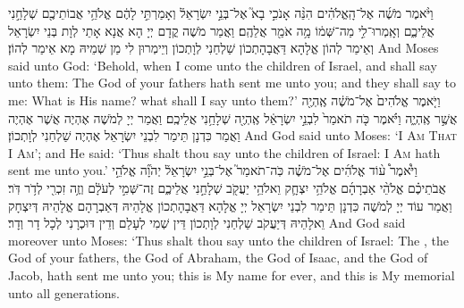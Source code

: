{וַיֹּ֨אמֶר מֹשֶׁ֜ה אֶל־הָֽאֱלֹהִ֗ים הִנֵּ֨ה אָנֹכִ֣י בָא֮ אֶל־בְּנֵ֣י יִשְׂרָאֵל֒ וְאָמַרְתִּ֣י לָהֶ֔ם אֱלֹהֵ֥י אֲבוֹתֵיכֶ֖ם שְׁלָחַ֣נִי אֲלֵיכֶ֑ם וְאָֽמְרוּ־לִ֣י מַה־שְּׁמ֔וֹ מָ֥ה אֹמַ֖ר אֲלֵהֶֽם׃}
{וַאֲמַר מֹשֶׁה קֳדָם יְיָ הָא אֲנָא אָתֵי לְוָת בְּנֵי יִשְׂרָאֵל וְאֵימַר לְהוֹן אֱלָהָא דַּאֲבָהָתְכוֹן שַׁלְחַנִי לְוָתְכוֹן וְיֵימְרוּן לִי מַן שְׁמֵיהּ מָא אֵימַר לְהוֹן׃}
{And Moses said unto God: ‘Behold, when I come unto the children of Israel, and shall say unto them: The God of your fathers hath sent me unto you; and they shall say to me: What is His name? what shall I say unto them?’}{}
{וַיֹּ֤אמֶר אֱלֹהִים֙ אֶל־מֹשֶׁ֔ה אֶֽהְיֶ֖ה אֲשֶׁ֣ר אֶֽהְיֶ֑ה וַיֹּ֗אמֶר כֹּ֤ה תֹאמַר֙ לִבְנֵ֣י יִשְׂרָאֵ֔ל אֶֽהְיֶ֖ה שְׁלָחַ֥נִי אֲלֵיכֶֽם׃
}
{וַאֲמַר יְיָ לְמֹשֶׁה אֶהְיֶה אֲשֶׁר אֶהְיֶה וַאֲמַר כִּדְנָן תֵּימַר לִבְנֵי יִשְׂרָאֵל אֶהְיֶה שַׁלְחַנִי לְוָתְכוֹן׃}
{And God said unto Moses: ‘\textsc{I Am That I Am}’; and He said: ‘Thus shalt thou say unto the children of Israel: \textsc{I Am} hath sent me unto you.’}{}
{וַיֹּ֩אמֶר֩ ע֨וֹד אֱלֹהִ֜ים אֶל־מֹשֶׁ֗ה כֹּֽה־תֹאמַר֮ אֶל־בְּנֵ֣י יִשְׂרָאֵל֒ יְהֹוָ֞ה אֱלֹהֵ֣י אֲבֹתֵיכֶ֗ם אֱלֹהֵ֨י אַבְרָהָ֜ם אֱלֹהֵ֥י יִצְחָ֛ק וֵאלֹהֵ֥י יַעֲקֹ֖ב שְׁלָחַ֣נִי אֲלֵיכֶ֑ם זֶה־שְּׁמִ֣י לְעֹלָ֔ם וְזֶ֥ה זִכְרִ֖י לְדֹ֥ר דֹּֽר׃
}
{וַאֲמַר עוֹד יְיָ לְמֹשֶׁה כִּדְנָן תֵּימַר לִבְנֵי יִשְׂרָאֵל יְיָ אֱלָהָא דַּאֲבָהָתְכוֹן אֱלָהֵיהּ דְּאַבְרָהָם אֱלָהֵיהּ דְּיִצְחָק וֵאלָהֵיהּ דְּיַעֲקֹב שַׁלְחַנִי לְוָתְכוֹן דֵּין שְׁמִי לְעָלַם וְדֵין דּוּכְרָנִי לְכָל דָר וְדָר׃}
{And God said moreover unto Moses: ‘Thus shalt thou say unto the children of Israel: The \lord, the God of your fathers, the God of Abraham, the God of Isaac, and the God of Jacob, hath sent me unto you; this is My name for ever, and this is My memorial unto all generations.}{}
